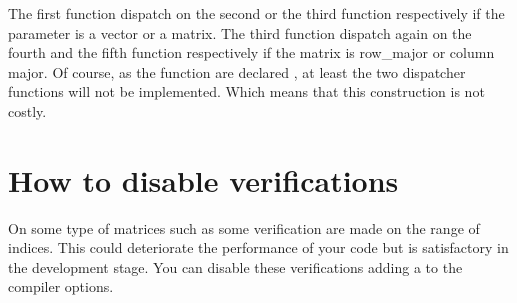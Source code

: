 \documentclass[a4paper,11pt,english]{sphinxmanual}
\begin{document}
The first function dispatch on the second or the third function respectively if the parameter is a vector or a matrix. The third function dispatch again on the fourth and the fifth function respectively if the matrix is row\_major or column major. Of course, as the function are declared , at least the two dispatcher functions will not be implemented. Which means that this construction is not costly.


\chapter{How to disable verifications}
\label{\detokenize{gmm/noverif:how-to-disable-verifications}}\label{\detokenize{gmm/noverif:gmm-noverif}}\label{\detokenize{gmm/noverif::doc}}
On some type of matrices such as  some verification are made on the range of indices. This could deteriorate  the performance of your code but is satisfactory in the development stage. You can disable these verifications adding a  to the compiler options.



\renewcommand{\indexname}{Index}
\printindex
\end{document}
